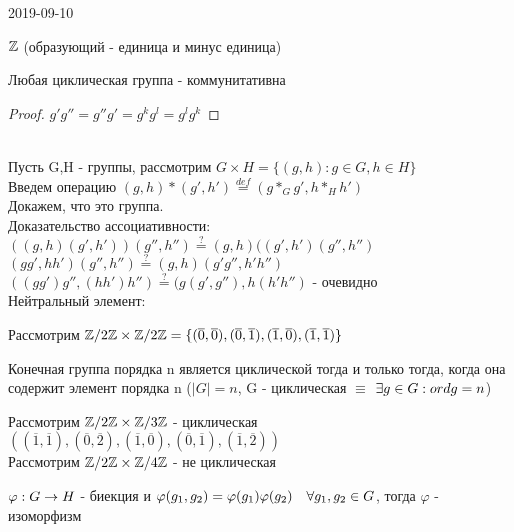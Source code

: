 \documentclass[main]{subfiles}
\begin{document}
\begin{lect} {2019-09-10}
	\begin{definition}
	    $\mathbb{Z}$ (образующий - единица и минус единица)
	\end{definition}

	\begin{remark}
	    Любая циклическая группа - коммунитативна
	\end{remark}

	\begin{proof}
	    $g' g'' = g'' g' = g^k g^l = g^l g^k$
	\end{proof}
	\\
	Пусть G,H - группы, рассмотрим $G \times H = \{(g,h): g\in G, h\in H\}$\\
	Введем операцию $(g,h)*(g',h')\overset{def}{=}(g*_G g', h*_H h')$\\
	Докажем, что это группа.\\
	Доказательство ассоциативности:
	$((g,h)(g',h'))(g'',h'') \overset{?}{=} (g,h)((g',h')(g'',h'')$\\
	$(gg',hh')(g'',h'') \overset{?}{=} (g,h)(g' g'', h' h'')$\\
	$((gg')g'',(hh')h'') \overset{?}{=} (g(g',g''),h(h'h'')$ - очевидно\\
	Нейтральный элемент:

	Рассмотрим $\mathbb{Z} /2 \mathbb{Z} \times \mathbb{Z} /2 \mathbb{Z} = \{(\overline{0},\overline{0}),(\overline{0},\overline{1}),(\overline{1},\overline{0}),(\overline{1},\overline{1})\}$

	\begin{definition}
	    Конечная группа порядка n является циклической тогда и только тогда, когда она содержит элемент порядка n ($|G|=n$, G - циклическая $\equiv$ $\exists g \in G: ord g = n$)
	\end{definition}
	Рассмотрим $\mathbb{Z} /2 \mathbb{Z} \times \mathbb{Z} /3 \mathbb{Z}$ - циклическая\\
	$((\overline{1},\overline{1}), (\overline{0}, \overline{2}), (\overline{1}, \overline{0}), (\overline{0}, \overline{1}), (\overline{1},\overline{2}))$\\
	Рассмотрим $\mathbb{Z} /2 \mathbb{Z} \times \mathbb{Z} /4 \mathbb{Z}$ - не циклическая

	\begin{definition}
	    $\varphi: G \rightarrow H$ - биекция и $\varphi(g_1,g_2)=\varphi(g_1) \varphi(g_2)\quad \forall g_1,g_2 \in G$, тогда $\varphi$ - изоморфизм
	\end{definition}


\end{lect}
\end{document}
